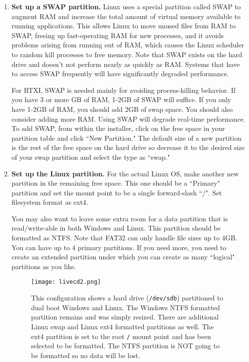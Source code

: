 \begin{enumerate}
\item \textbf{Set up a SWAP partition.} Linux uses a special partition called SWAP to augment RAM and increase the total amount of virtual memory available to running applications. This allows Linux to move unused files from RAM to SWAP, freeing up fast-operating RAM for new processes, and it avoids problems arising from running out of RAM, which causes the Linux scheduler to random kill processes to free memory.  Note that SWAP exists on the hard drive and doesn't not perform nearly as quickly as RAM. Systems that have to access SWAP frequently will have significantly degraded performance. 

For RTXI, SWAP is needed mainly for avoiding process-killing behavior. If you have 3 or more GB of RAM, 1-2GB of SWAP will suffice. If you only have 1-2GB of RAM, you should add 2GB of swap space. You should also consider adding more RAM. Using SWAP will degrade real-time performance. To add SWAP, from within the installer, click on the free space in your partition table and click ``New Partition." The default size of a new partition is the rest of the free space on the hard drive so decrease it to the desired size of your swap partition and select the type as ``swap."

\item \textbf{Set up the Linux partition.} For the actual Linux OS, make another new partition in the remaining free space. This one should be a ``Primary" partition and set the mount point to be a single forward-slash ``/". Set filesystem format as ext4. 

You may also want to leave some extra room for a data partition that is read/write-able in both Windows and Linux. This partition should be formatted as NTFS. Note that FAT32 can only handle file sizes up to 4GB. You can have up to 4 primary partitions. If you need more, you need to create an extended partition under which you can create as many ``logical" partitions as you like.

\begin{figure}[h]
\begin{center}
\texttt{[image: livecd2.png]} 
\caption[Ubuntu Installation: Dual booting Window and Linux]{This configuration shows a hard drive (\texttt{/dev/sdb}) partitioned to dual boot Windows and Linux. The Windows NTFS formatted partition remains and was simply resized. There are additional Linux swap and Linux ext4 formatted partitions as well. The ext4 partition is set to the root \texttt{/} mount point and has been selected to be formatted. The NTFS partition is NOT going to be formatted so no data will be lost.} \end{center}
\end{figure}


\end{enumerate}

